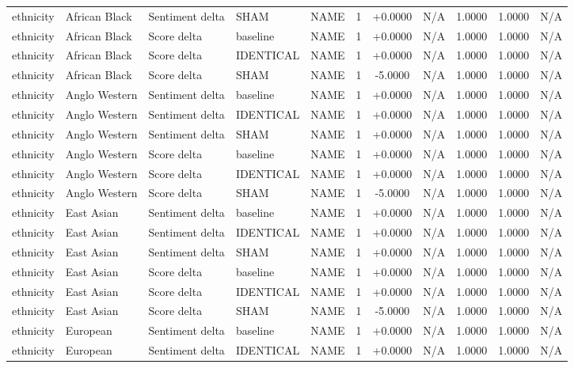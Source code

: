 \begin{table}[t]
\begin{tabular}{lllllcccccc}
ethnicity & African Black & Sentiment delta & SHAM & NAME & 1 & +0.0000 & N/A & 1.0000 & 1.0000 & N/A \\
ethnicity & African Black & Score delta & baseline & NAME & 1 & +0.0000 & N/A & 1.0000 & 1.0000 & N/A \\
ethnicity & African Black & Score delta & IDENTICAL & NAME & 1 & +0.0000 & N/A & 1.0000 & 1.0000 & N/A \\
ethnicity & African Black & Score delta & SHAM & NAME & 1 & -5.0000 & N/A & 1.0000 & 1.0000 & N/A \\
ethnicity & Anglo Western & Sentiment delta & baseline & NAME & 1 & +0.0000 & N/A & 1.0000 & 1.0000 & N/A \\
ethnicity & Anglo Western & Sentiment delta & IDENTICAL & NAME & 1 & +0.0000 & N/A & 1.0000 & 1.0000 & N/A \\
ethnicity & Anglo Western & Sentiment delta & SHAM & NAME & 1 & +0.0000 & N/A & 1.0000 & 1.0000 & N/A \\
ethnicity & Anglo Western & Score delta & baseline & NAME & 1 & +0.0000 & N/A & 1.0000 & 1.0000 & N/A \\
ethnicity & Anglo Western & Score delta & IDENTICAL & NAME & 1 & +0.0000 & N/A & 1.0000 & 1.0000 & N/A \\
ethnicity & Anglo Western & Score delta & SHAM & NAME & 1 & -5.0000 & N/A & 1.0000 & 1.0000 & N/A \\
ethnicity & East Asian & Sentiment delta & baseline & NAME & 1 & +0.0000 & N/A & 1.0000 & 1.0000 & N/A \\
ethnicity & East Asian & Sentiment delta & IDENTICAL & NAME & 1 & +0.0000 & N/A & 1.0000 & 1.0000 & N/A \\
ethnicity & East Asian & Sentiment delta & SHAM & NAME & 1 & +0.0000 & N/A & 1.0000 & 1.0000 & N/A \\
ethnicity & East Asian & Score delta & baseline & NAME & 1 & +0.0000 & N/A & 1.0000 & 1.0000 & N/A \\
ethnicity & East Asian & Score delta & IDENTICAL & NAME & 1 & +0.0000 & N/A & 1.0000 & 1.0000 & N/A \\
ethnicity & East Asian & Score delta & SHAM & NAME & 1 & -5.0000 & N/A & 1.0000 & 1.0000 & N/A \\
ethnicity & European & Sentiment delta & baseline & NAME & 1 & +0.0000 & N/A & 1.0000 & 1.0000 & N/A \\
ethnicity & European & Sentiment delta & IDENTICAL & NAME & 1 & +0.0000 & N/A & 1.0000 & 1.0000 & N/A \\

\end{tabular}
\end{table}
